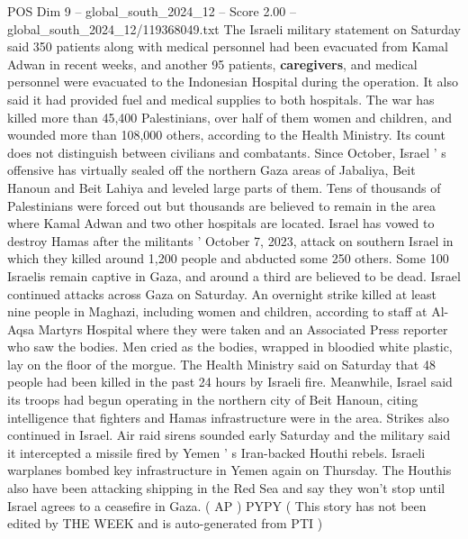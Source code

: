 \begin{textsample}{POS Dim 9 – global\_south\_2024\_12 – Score 2.00 – global\_south\_2024\_12/119368049.txt}
The Israeli military statement on Saturday said 350 patients along with medical personnel had been evacuated from Kamal Adwan in recent weeks, and another 95 patients, \textbf{caregivers}, and medical personnel were evacuated to the Indonesian Hospital during the operation.
It also said it had provided fuel and medical supplies to both hospitals.
The war has killed more than 45,400 Palestinians, over half of them women and children, and wounded more than 108,000 others, according to the Health Ministry.
Its count does not distinguish between civilians and combatants.
Since October, Israel ' s offensive has virtually sealed off the northern Gaza areas of Jabaliya, Beit Hanoun and Beit Lahiya and leveled large parts of them.
Tens of thousands of Palestinians were forced out but thousands are believed to remain in the area where Kamal Adwan and two other hospitals are located.
Israel has vowed to destroy Hamas after the militants ' October 7, 2023, attack on southern Israel in which they killed around 1,200 people and abducted some 250 others.
Some 100 Israelis remain captive in Gaza, and around a third are believed to be dead.
Israel continued attacks across Gaza on Saturday.
An overnight strike killed at least nine people in Maghazi, including women and children, according to staff at Al-Aqsa Martyrs Hospital where they were taken and an Associated Press reporter who saw the bodies.
Men cried as the bodies, wrapped in bloodied white plastic, lay on the floor of the morgue.
The Health Ministry said on Saturday that 48 people had been killed in the past 24 hours by Israeli fire.
Meanwhile, Israel said its troops had begun operating in the northern city of Beit Hanoun, citing intelligence that fighters and Hamas infrastructure were in the area.
Strikes also continued in Israel.
Air raid sirens sounded early Saturday and the military said it intercepted a missile fired by Yemen ' s Iran-backed Houthi rebels.
Israeli warplanes bombed key infrastructure in Yemen again on Thursday.
The Houthis also have been attacking shipping in the Red Sea and say they won't stop until Israel agrees to a ceasefire in Gaza. ( AP ) PYPY ( This story has not been edited by THE WEEK and is auto-generated from PTI )

\end{textsample}

